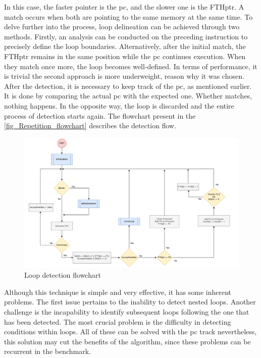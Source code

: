 In this case, the faster pointer is the \gls{pc}, and the slower one is the FTHptr. A match occurs when both are pointing to the same memory at 
the same time. To delve further into the process, loop delineation can be achieved through two methods. Firstly, an analysis can be conducted on 
the preceding instruction to precisely define the loop boundaries. Alternatively, after the initial match, the FTHptr remains in the same position 
while the \gls{pc} continues execution. When they match once more, the loop becomes well-defined. In terms of performance, it is trivial the 
second approach is more underweight, reason why it was chosen. After the detection, it is necessary to keep track of the \gls{pc}, as mentioned 
earlier. It is done by comparing the actual \gls{pc} with the expected one. Whether matches, nothing happens. In the opposite way, the loop is 
discarded and the entire process of detection starts again. The flowchart present in the \autoref{fig_Repetition_flowchart} describes the detection 
flow. 

\begin{figure}[h!]
	\centering
 	\includegraphics[width=1\linewidth]{Images/Repetition_flowchart.png}
 	\caption{Loop detection flowchart}
	 \label{fig_Repetition_flowchart}
\end{figure}


Although this technique is simple and very effective, it has some inherent problems. The first issue pertains to the inability to detect 
nested loops. Another challenge is the incapability to identify subsequent loops following the one that has been detected. The most crucial 
problem is the difficulty in detecting conditions within loops. All of these can be solved with the \gls{pc} track nevertheless, this solution 
may cut the benefits of the algorithm, since these problems can be recurrent in the benchmark. 

